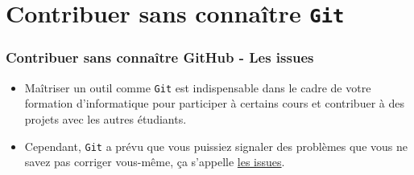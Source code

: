 \documentclass{beamer}
\begin{document}
\section{Contribuer sans connaître \texttt{Git}}

\begin{frame}
    \frametitle{Contribuer sans connaître GitHub - Les issues}
    \begin{itemize}
        \item Ma\^itriser un outil comme \lstinline|Git| est indispensable dans le
            cadre de votre formation d'informatique pour participer à
            certains cours et contribuer à des projets avec les autres
            étudiants.
        \item Cependant, \lstinline|Git| a prévu que vous puissiez signaler des
            problèmes que vous ne savez pas corriger vous-même, ça
            s'appelle \href{https://github.com/Gp2mv3/Syntheses/issues}{les issues}.
    \end{itemize}
\end{frame}
\end{document}
